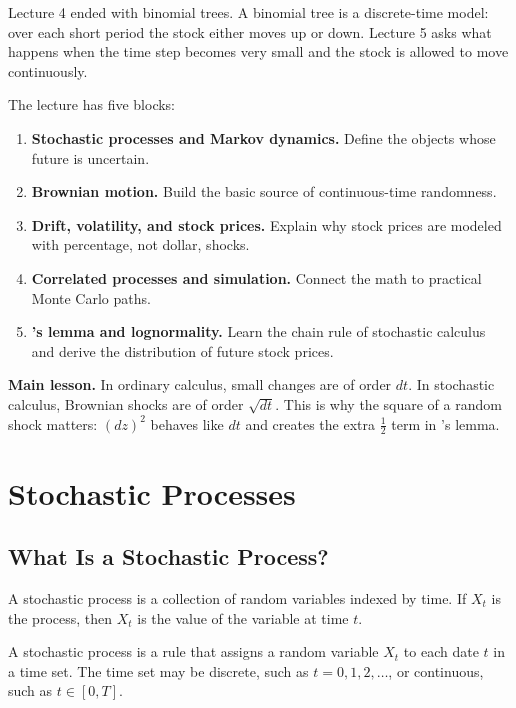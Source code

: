 Lecture 4 ended with binomial trees. A binomial tree is a discrete-time model:
over each short period the stock either moves up or down. Lecture 5 asks what
happens when the time step becomes very small and the stock is allowed to move
continuously.

The lecture has five blocks:
\begin{enumerate}
    \item \textbf{Stochastic processes and Markov dynamics.} Define the objects
    whose future is uncertain.
    \item \textbf{Brownian motion.} Build the basic source of continuous-time
    randomness.
    \item \textbf{Drift, volatility, and stock prices.} Explain why stock prices
    are modeled with percentage, not dollar, shocks.
    \item \textbf{Correlated processes and simulation.} Connect the math to
    practical Monte Carlo paths.
    \item \textbf{\Ito's lemma and lognormality.} Learn the chain rule of
    stochastic calculus and derive the distribution of future stock prices.
\end{enumerate}

\begin{boxF}
\textbf{Main lesson.} In ordinary calculus, small changes are of order $dt$.
In stochastic calculus, Brownian shocks are of order $\sqrt{dt}$. This is why
the square of a random shock matters: $(dz)^2$ behaves like $dt$ and creates
the extra $\frac{1}{2}$ term in \Ito's lemma.
\end{boxF}

\section{Stochastic Processes}

\subsection{What Is a Stochastic Process?}

A stochastic process is a collection of random variables indexed by time. If
$X_t$ is the process, then $X_t$ is the value of the variable at time $t$.

\begin{defN}
A stochastic process is a rule that assigns a random variable $X_t$ to each
date $t$ in a time set. The time set may be discrete, such as
$t=0,1,2,\ldots$, or continuous, such as $t\in[0,T]$.
\end{defN}


